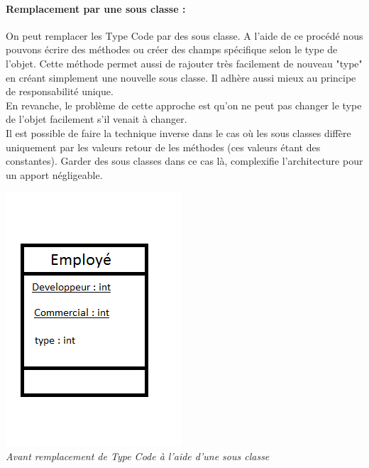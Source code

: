 \documentclass[a4paper,twoside,12pt,openright]{report}
\begin{document}
\paragraph{Remplacement par une sous classe :}
On peut remplacer les Type Code par des sous classe. A l'aide de ce procédé nous pouvons écrire des méthodes ou créer des champs spécifique selon le type de l'objet. Cette méthode permet aussi de rajouter très facilement de nouveau "type" en créant simplement une nouvelle sous classe.
Il adhère aussi mieux au principe de responsabilité unique.\\
En revanche, le problème de cette approche est qu'on ne peut pas changer le type de l'objet facilement s'il venait à changer.\\
Il est possible de faire la technique inverse dans le cas où les sous classes diffère uniquement par les valeurs retour de les méthodes (ces valeurs étant des constantes). Garder des sous classes dans ce cas là, complexifie l'architecture pour un apport négligeable.

\begin{center}
\includegraphics[scale=1]{Image/TypeCode_SousClasse.png}\\
\itshape{Avant remplacement de Type Code à l'aide d'une sous classe}
\end{center}
\end{document}
